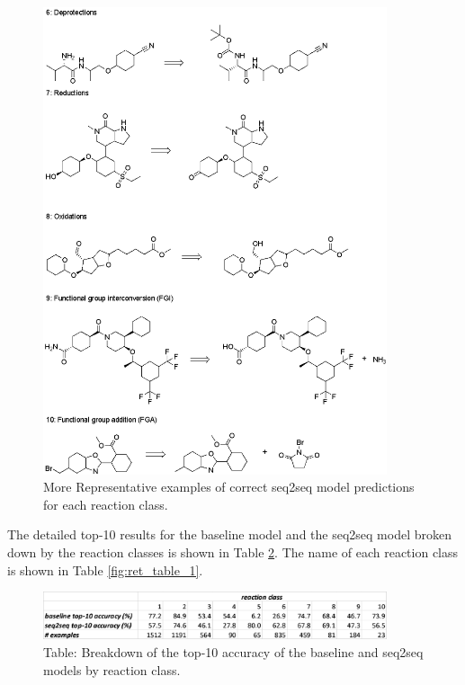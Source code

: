 \begin{figure}
  \centering
  \includegraphics[width=0.9\textwidth]{Images/ret_seq2seq_correct_part_2.png}
  \caption{More Representative examples of correct seq2seq model predictions for each reaction class.}
  \label{fig:ret_table2}
\end{figure}

The detailed top-10 results for the baseline model and the seq2seq model broken down by the reaction classes is shown in Table \ref{fig:ret_table3}. The name of each reaction class is shown in Table \ref{fig:ret_table_1}.

\begin{figure}
  \centering
  \includegraphics[width=0.9\textwidth]{Images/ret_table_3.png}
  \caption{Table: Breakdown of the top-10 accuracy of the baseline and seq2seq models by reaction class.}
  \label{fig:ret_table3}
\end{figure}

